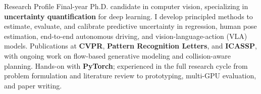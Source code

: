 \begin{rubric}{Research Profile}
\entry*[]
	Final-year Ph.D. candidate in computer vision, specializing in \textbf{uncertainty quantification} for deep learning. I develop principled methods to estimate, evaluate, and calibrate predictive uncertainty in regression, human pose estimation, end-to-end autonomous driving, and vision-language-action (VLA) models.
\entry*[]
	Publications at \textbf{CVPR}, \textbf{Pattern Recognition Letters}, and \textbf{ICASSP}, with ongoing work on flow-based generative modeling and collision-aware planning.
\entry*[]
	Hands-on with \textbf{PyTorch}; experienced in the full research cycle from problem formulation and literature review to prototyping, multi-GPU evaluation, and paper writing.
\end{rubric}
